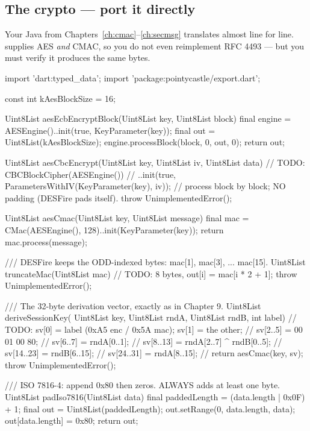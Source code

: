 \subsection{The crypto --- port it directly}

Your Java from Chapters~\ref{ch:cmac}--\ref{ch:secmsg} translates almost line for
line.  supplies AES \emph{and} CMAC, so you do not even
reimplement RFC 4493 --- but you must verify it produces the same bytes.

\begin{dcode}
import 'dart:typed_data';
import 'package:pointycastle/export.dart';

const int kAesBlockSize = 16;

Uint8List aesEcbEncryptBlock(Uint8List key, Uint8List block) {
  final engine = AESEngine()..init(true, KeyParameter(key));
  final out = Uint8List(kAesBlockSize);
  engine.processBlock(block, 0, out, 0);
  return out;
}

Uint8List aesCbcEncrypt(Uint8List key, Uint8List iv, Uint8List data) {
  // TODO: CBCBlockCipher(AESEngine())
  //         ..init(true, ParametersWithIV(KeyParameter(key), iv));
  //       process block by block; NO padding (DESFire pads itself).
  throw UnimplementedError();
}

Uint8List aesCmac(Uint8List key, Uint8List message) {
  final mac = CMac(AESEngine(), 128)..init(KeyParameter(key));
  return mac.process(message);
}

/// DESFire keeps the ODD-indexed bytes: mac[1], mac[3], ... mac[15].
Uint8List truncateMac(Uint8List mac) {
  // TODO: 8 bytes, out[i] = mac[i * 2 + 1];
  throw UnimplementedError();
}

/// The 32-byte derivation vector, exactly as in Chapter 9.
Uint8List deriveSessionKey(
    Uint8List key, Uint8List rndA, Uint8List rndB, int label) {
  // TODO: sv[0] = label (0xA5 enc / 0x5A mac); sv[1] = the other;
  //       sv[2..5] = 00 01 00 80;
  //       sv[6..7] = rndA[0..1];
  //       sv[8..13] = rndA[2..7] ^ rndB[0..5];
  //       sv[14..23] = rndB[6..15];
  //       sv[24..31] = rndA[8..15];
  //       return aesCmac(key, sv);
  throw UnimplementedError();
}

/// ISO 7816-4: append 0x80 then zeros. ALWAYS adds at least one byte.
Uint8List padIso7816(Uint8List data) {
  final paddedLength = (data.length | 0x0F) + 1;
  final out = Uint8List(paddedLength);
  out.setRange(0, data.length, data);
  out[data.length] = 0x80;
  return out;
}
\end{dcode}

